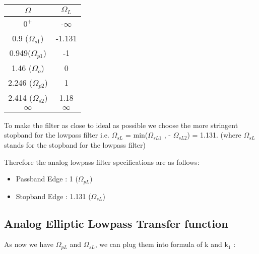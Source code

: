 \documentclass{article}
\begin{document}
\begin{table}[H]
		\begin{center}
		\begin{tabular}{|c|c|}
			\hline
			$\Omega$ & $\Omega_L$\\
			
			\hline
                $0^{+}$ & -$\infty$\\
                \hline
                0.9 ($\Omega_{s1}$) & -1.131 \\
                \hline
                0.949($\Omega_{p1}$) & -1\\
                \hline
                1.46 ($\Omega_o$) & 0\\
                \hline
                2.246 ($\Omega_{p2}$)  & 1 \\
                \hline
                2.414 ($\Omega_{s2}$) & 1.18\\
                \hline
                $\infty$ & $\infty$\\
                \hline
            
		\end{tabular}
		\end{center}
\end{table}

\vspace{1em}
\noindent
To make the filter as close to ideal as possible we choose the more stringent stopband for the lowpass filter i.e. $\Omega_{sL}$ = min($\Omega_{sL1}$ , - $\Omega_{sL2}$) = 1.131. (where $\Omega_{sL}$ stands for the stopband for the lowpass filter)

\vspace{1em}
\noindent
Therefore the analog lowpass filter specifications are as follows:
\begin{itemize}
    \item Passband Edge : 1 ($\Omega_{pL}$)
    \item Stopband Edge : 1.131 ($\Omega_{sL}$)
\end{itemize}

\subsection{Analog Elliptic Lowpass Transfer function}
As now we have $\Omega_{pL}$ and $\Omega_{sL}$, we can plug them into formula of k and k$_1$ :
\end{document}

